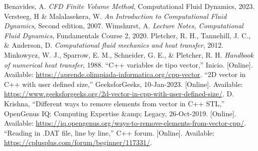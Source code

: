 \documentclass[article,latterpaper]{IEEEtran}
\begin{document}
\begin{thebibliography}{}
 Benavides, A. \textit{CFD Finite Volume Method}, Computational Fluid Dynamics, 2023.
 Versteeg, H \& Malalasekera, W. \textit{An Introduction to Computational Fluid Dynamics}, Second edition, 2007.
 Wimshurst, A. \textit{Lecture Notes, Computational Fluid Dynamics}, Fundamentals Course 2, 2020.
 Pletcher, R. H., Tannehill, J. C., \& Anderson, D. \textit{Computational fluid mechanics and heat transfer}, 2012.
 Minkowycz, W. J., Sparrow, E. M., Schneider, G. E., \& Pletcher, R. H. \textit{Handbook of numerical heat transfer}, 1988.
 “C++ variables de tipo vector,” Inicio. [Online]. Available: \url{https://aprende.olimpiada-informatica.org/cpp-vector}.
 “2D vector in C++ with user defined size,” GeeksforGeeks, 10-Jan-2023. [Online]. Available: \url{https://www.geeksforgeeks.org/2d-vector-in-cpp-with-user-defined-size/}. 
 D. Krishna, “Different ways to remove elements from vector in C++ STL,” OpenGenus IQ: Computing Expertise \&amp; Legacy, 26-Oct-2019. [Online]. Available: \url{https://iq.opengenus.org/ways-to-remove-elements-from-vector-cpp/}. 
 “Reading in .DAT file, line by line,” C++ forum. [Online]. Available: \url{https://cplusplus.com/forum/beginner/117331/}. 
\end{thebibliography}
\end{document}
